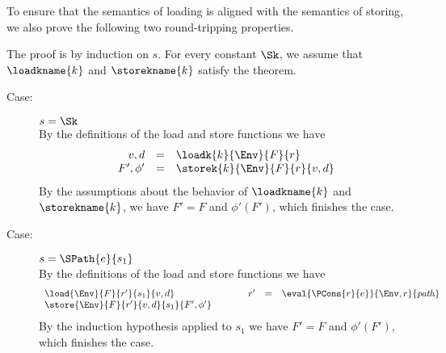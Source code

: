 To ensure that the semantics of loading is aligned with the semantics
of storing, we also prove the following two round-tripping properties.
%
%
{ The proof is by induction on $s$. For every constant $\Sk$, we
  assume that $\loadkname{k}$ and $\storekname{k}$ satisfy the theorem. 
\begin{description}
\item[Case:] $s = \Sk$\\[1ex]
%
By the definitions of the load and store functions we have 
\[ 
\begin{array}{rcl}
v,d  &=& \loadk{k}{\Env}{F}{r}\\
F',\phi' &=& \storek{k}{\Env}{F}{r}{v,d}\\
\end{array}
\]
By the assumptions about the behavior of $\loadkname{k}$ and
$\storekname{k}$, we have $F' = F$ and $\phi'(F')$, which finishes the
case.

\item[Case:] $s=\SPath{e}{s_1}$\\[1ex]
%
By the definitions of the load and store functions we have 
%
\[ 
\begin{array}{l}
\load{\Env}{F}{r'}{s_1}{v,d}\\
\store{\Env}{F}{r'}{v,d}{s_1}{F',\phi'}
\end{array} \hspace*{1cm}
\begin{array}{rcl}
r' & = & \eval{\PCons{r}{e}}{\Env,r}{\mathit{path}}\\
\\
\end{array}
\]
%
By the induction hypothesis applied to $s_1$ we have $F' = F$ and
$\phi'(F')$, which finishes the case.


\end{description}}
